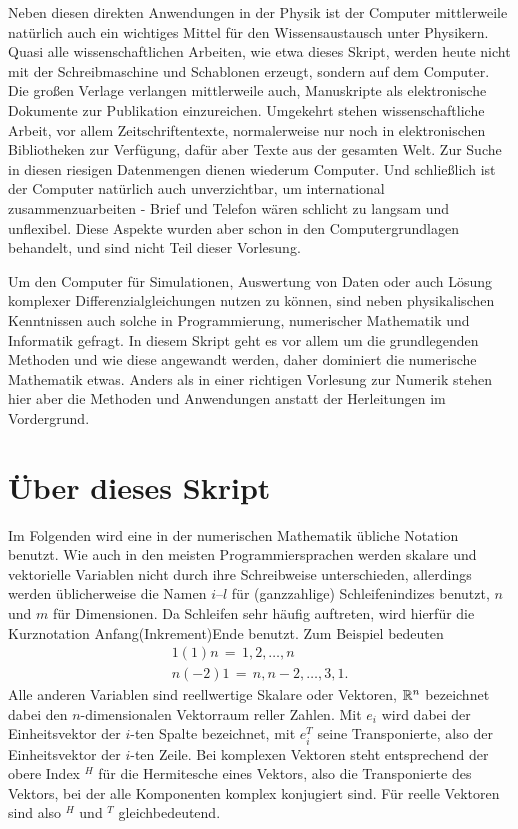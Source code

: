 Neben diesen direkten Anwendungen in der Physik ist der Computer
mittlerweile natürlich auch ein wichtiges Mittel für den
Wissensaustausch unter Physikern. Quasi alle wissenschaftlichen
Arbeiten, wie etwa dieses Skript, werden heute nicht mit der
Schreibmaschine und Schablonen erzeugt, sondern auf dem Computer. Die
großen Verlage verlangen mittlerweile auch, Manuskripte als
elektronische Dokumente zur Publikation einzureichen. Umgekehrt stehen
wissenschaftliche Arbeit, vor allem Zeitschriftentexte, normalerweise
nur noch in elektronischen Bibliotheken zur Verfügung, dafür aber
Texte aus der gesamten Welt. Zur Suche in diesen riesigen Datenmengen
dienen wiederum Computer. Und schließlich ist der Computer natürlich
auch unverzichtbar, um international zusammenzuarbeiten - Brief und
Telefon wären schlicht zu langsam und unflexibel. Diese Aspekte wurden
aber schon in den Computergrundlagen behandelt, und sind nicht Teil
dieser Vorlesung.

Um den Computer für Simulationen, Auswertung von Daten oder auch
Lösung komplexer Differenzialgleichungen nutzen zu können, sind neben
physikalischen Kenntnissen auch solche in Programmierung, numerischer
Mathematik und Informatik gefragt. In diesem Skript geht es vor allem
um die grundlegenden Methoden und wie diese angewandt werden, daher
dominiert die numerische Mathematik etwas. Anders als in einer
richtigen Vorlesung zur Numerik stehen hier aber die Methoden und
Anwendungen anstatt der Herleitungen im Vordergrund.

\section{Über dieses Skript}

Im Folgenden wird eine in der numerischen Mathematik übliche Notation
benutzt. Wie auch in den meisten Programmiersprachen werden skalare
und vektorielle Variablen nicht durch ihre Schreibweise unterschieden,
allerdings werden üblicherweise die Namen $i$--$l$ für (ganzzahlige)
Schleifenindizes benutzt, $n$ und $m$ für Dimensionen. Da Schleifen sehr
häufig auftreten, wird hierfür die Kurznotation Anfang(Inkrement)Ende
benutzt. Zum Beispiel bedeuten
\begin{align*}
  1(1)n\,=\,1,2,\ldots, n\\
  n(-2)1\,=\,n, n-2,\ldots, 3, 1.
\end{align*}
Alle anderen Variablen sind reellwertige Skalare oder Vektoren,
$\mathbb{R}^n$ bezeichnet dabei den $n$-dimensionalen Vektorraum reller
Zahlen. Mit $e_i$ wird dabei der Einheitsvektor der $i$-ten Spalte
bezeichnet, mit $e_i^T$ seine Transponierte, also der Einheitsvektor
der $i$-ten Zeile. Bei komplexen Vektoren steht entsprechend der obere
Index $^H$ für die Hermitesche eines Vektors, also die Transponierte
des Vektors, bei der alle Komponenten komplex konjugiert sind. Für
reelle Vektoren sind also $^H$ und $^T$ gleichbedeutend.


